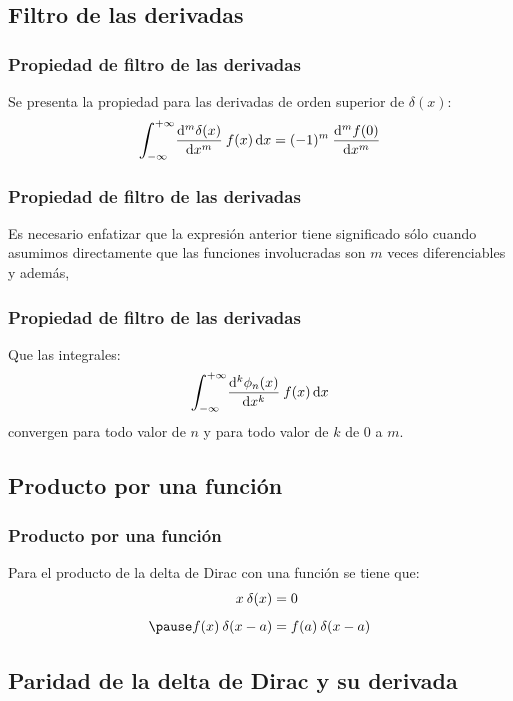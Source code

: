 \documentclass[12pt]{beamer}
\begin{document}
\subsection{Filtro de las derivadas}

\begin{frame}
\frametitle{Propiedad de filtro de las derivadas}
Se presenta la propiedad para las derivadas de orden superior de $\delta (x)$:
\pause
\begin{align*}
\scaleint{6ex}_{\bs -\infty}^{+\infty} \dv[m]{\delta (x)}{x} \: f (x) \dd{x} =  (-1)^{m} \: \dv[m]{f (0)}{x}
\end{align*}
\end{frame}
\begin{frame}
\frametitle{Propiedad de filtro de las derivadas}
Es necesario enfatizar que la expresión anterior tiene significado sólo cuando asumimos directamente que las funciones involucradas son $m$ veces diferenciables y además,
\end{frame}
\begin{frame}
\frametitle{Propiedad de filtro de las derivadas}
Que las integrales:
\pause
\begin{align*}
\scaleint{6ex}_{\bs -\infty}^{+\infty} \dv[k]{\phi_{n}(x)}{x} \: f (x) \dd{x}
\end{align*}
convergen para todo valor de $n$ y para todo valor de $k$ de $0$ a $m$.
\end{frame}

\subsection{Producto por una función}

\begin{frame}
\frametitle{Producto por una función}
Para el producto de la delta de Dirac con una función se tiene que:
\pause
\begin{eqnarray*}
\begin{aligned}
x \: \delta(x) &= 0 \\[0.5em] \pause
f (x) \: \delta(x - a) &= f (a) \: \delta (x - a)
\end{aligned}
\end{eqnarray*}
\end{frame}

\subsection{Paridad de la delta de Dirac y su derivada}
\end{document}
